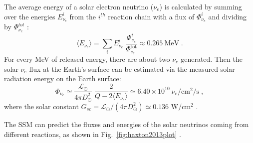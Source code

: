 The average energy of a solar electron neutrino ($\nu_e$) is calculated by summing over the energies $E^i_{\nu_e}$ from the $i^{th}$ reaction chain with a flux of $\Phi_{\nu_e}^i$ and dividing by $\Phi^{tot}_{\nu_e}$ \cite{antonio2018state}:
\begin{equation}\label{eq:solarNuEaverage}
\langle E_{\nu_e}\rangle = \sum_i E^i_{\nu_e} \; \frac{\Phi^i_{\nu_e}}{\Phi^{\mathrm{tot}}_{\nu_e}}\approx 0.265~\mathrm{MeV}\; .
\end{equation}
For every MeV of released energy, there are about two $\nu_e$ generated. Then the solar $\nu_e$ flux at the Earth's surface can be estimated via the measured solar radiation energy on the Earth surface:
\begin{equation}
\Phi_{\nu_e} \simeq \frac{\mathcal{L}_{\odot}}{4\pi D_\odot^2} \; \frac{2}{Q-2\langle E_{\nu_e} \rangle}\simeq 6.40\times 10^{10}~\nu_e/\mathrm{cm^2/s} \; ,
\end{equation}
where the solar constant $G_{sc}=\mathcal{L}_\odot/(4\pi D^2_\odot)\simeq 0.136$ W/cm$^2$ \cite{suekane2015neutrino}. 

The SSM can predict the fluxes and energies of the solar neutrinos coming from different reactions, as shown in Fig.~\ref{fig:haxton2013plot} \cite{haxton2013solar}.

